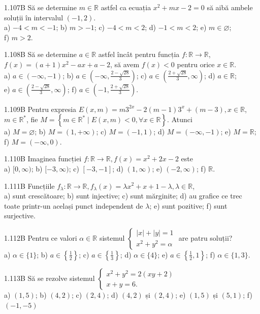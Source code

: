 \documentclass[11pt]{article}
\begin{document}
1.107B Să se determine $m \in \mathbb{R}$ astfel ca ecuația $x^{2}+m x-2=0$ să aibă ambele soluții în intervalul $(-1,2)$.\\ a) $-4<m<-1$; b) $m>-1$; c) $-4<m<2$; d) $-1<m<2$; e) $m \in \varnothing$;\\ f) $m>2$.

1.108B Să se determine $a \in \mathbb{R}$ astfel încât pentru funcția $f: \mathbb{R} \rightarrow \mathbb{R}$, $f(x)=(a+1) x^{2}-a x+a-2$, să avem $f(x)<0$ pentru orice $x \in \mathbb{R}$.\\ a) $a \in(-\infty,-1)$; b) $a \in\left(-\infty, \frac{2-\sqrt{28}}{3}\right)$; c) $a \in\left(\frac{2+\sqrt{28}}{3}, \infty\right)$; d) $a \in \mathbb{R}$;\\ e) $a \in\left(\frac{2-\sqrt{28}}{3}, \infty\right)$; f) $a \in\left(-1, \frac{2+\sqrt{28}}{3}\right)$.

1.109B Pentru expresia $E(x, m)=m 3^{2 x}-2(m-1) 3^{x}+(m-3), x \in \mathbb{R}$, $m \in \mathbb{R}^{*}$, fie $M=\left\{m \in \mathbb{R}^{*} \mid E(x, m)<0, \forall x \in \mathbb{R}\right\}$. Atunci\\ a) $M=\varnothing$; b) $M=(1,+\infty)$; c) $M=(-1,1)$; d) $M=(-\infty,-1)$; e) $M=\mathbb{R}$; f) $M=(-\infty, 0)$.

1.110B Imaginea funcției $f: \mathbb{R} \rightarrow \mathbb{R}, f(x)=x^{2}+2 x-2$ este\\ a) $[0, \infty)$; b) $[-3, \infty)$; c) $[-3,-1]$; d) $(1, \infty)$; e) $(-2, \infty)$; f) $\mathbb{R}$.

1.111B Funcțiile $f_{\lambda}: \mathbb{R} \rightarrow \mathbb{R}, f_{\lambda}(x)=\lambda x^{2}+x+1-\lambda, \lambda \in \mathbb{R}$,\\ a) sunt crescătoare; b) sunt injective; c) sunt mărginite; d) au grafice ce trec toate printr-un același punct independent de $\lambda$; e) sunt pozitive; f) sunt surjective.

1.112B Pentru ce valori $\alpha \in \mathbb{R}$ sistemul $\left\{\begin{array}{l}|x|+|y|=1 \\ x^{2}+y^{2}=\alpha\end{array}\right.$ are patru soluții?\\  a) $\alpha \in\{1\}$; b) $a \in\left\{\frac{1}{2}\right\}$; c) $a \in\left\{\frac{1}{3}\right\}$; d) $\alpha \in\{4\}$; e) $a \in\left\{\frac{1}{2}, 1\right\}$; f) $\alpha \in\{1,3\}$.

1.113B Să se rezolve sistemul $\left\{\begin{array}{l}x^{2}+y^{2}=2(x y+2) \\ x+y=6 .\end{array}\right.$\\ a) $(1,5)$; b) $(4,2)$; c) $(2,4)$; d) $(4,2)$ și $(2,4)$; e) $(1,5)$ și $(5,1)$; f) $(-1,-5)$
\end{document}
